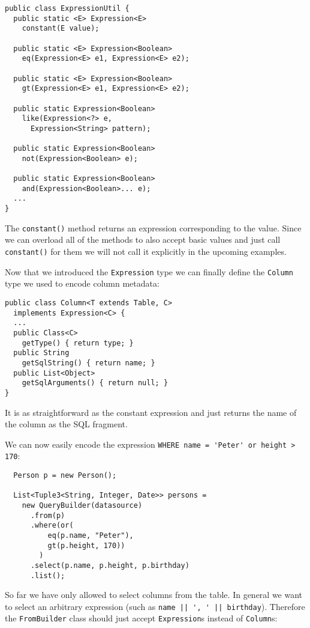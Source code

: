 \documentclass{sig-alternate}
\begin{document}
\begin{verbatim}
public class ExpressionUtil {
  public static <E> Expression<E> 
    constant(E value);

  public static <E> Expression<Boolean> 
    eq(Expression<E> e1, Expression<E> e2);

  public static <E> Expression<Boolean> 
    gt(Expression<E> e1, Expression<E> e2);

  public static Expression<Boolean> 
    like(Expression<?> e,
      Expression<String> pattern);

  public static Expression<Boolean> 
    not(Expression<Boolean> e);

  public static Expression<Boolean> 
    and(Expression<Boolean>... e);
  ...
}
\end{verbatim}

The \verb!constant()! method returns an expression corresponding to the value. Since we can overload all of the methods to also accept basic values and just call \verb!constant()! for them we will not call it explicitly in the upcoming examples.

Now that we introduced the \verb!Expression! type we can finally define the \verb!Column! type we used to encode column metadata:

\begin{verbatim}
public class Column<T extends Table, C> 
  implements Expression<C> {
  ...
  public Class<C> 
    getType() { return type; }
  public String 
    getSqlString() { return name; }
  public List<Object> 
    getSqlArguments() { return null; }		
}
\end{verbatim}

It is as straightforward as the constant expression and just returns the name of the column as the SQL fragment.

We can now easily encode the expression \verb!WHERE name = 'Peter' or height > 170!:

\begin{verbatim}
  Person p = new Person();
		
  List<Tuple3<String, Integer, Date>> persons =
    new QueryBuilder(datasource)
      .from(p)
      .where(or(
          eq(p.name, "Peter"),
          gt(p.height, 170))
        )
      .select(p.name, p.height, p.birthday)
      .list();
\end{verbatim}


So far we have only allowed to select columns from the table. In general we want to select an arbitrary expression (such as \verb!name || ', ' || birthday!). Therefore the \verb!FromBuilder! class should just accept \verb!Expression!s instead of \verb!Column!s:
\end{document}
